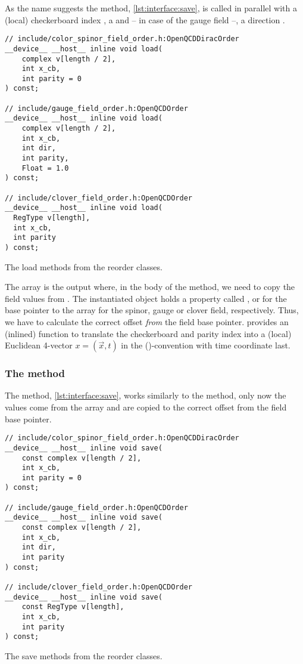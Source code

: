 As the name suggests the  method, \cref{lst:interface:save}, is called in parallel with a (local) checkerboard index , a  and -- in case of the gauge field --, a direction .
\begin{codelisting}
\begin{verbatim}
// include/color_spinor_field_order.h:OpenQCDDiracOrder
__device__ __host__ inline void load(
    complex v[length / 2],
    int x_cb,
    int parity = 0
) const;

// include/gauge_field_order.h:OpenQCDOrder
__device__ __host__ inline void load(
    complex v[length / 2],
    int x_cb,
    int dir,
    int parity,
    Float = 1.0
) const;

// include/clover_field_order.h:OpenQCDOrder
__device__ __host__ inline void load(
  RegType v[length],
  int x_cb,
  int parity
) const;
\end{verbatim}
\caption{The load methods from the reorder classes.}
\label{lst:interface:load}
\end{codelisting}
The array  is the output where, in the body of the method, we need to copy the field values from \openqxd.
The instantiated object holds a property called ,  or  for the base pointer to the \openqxd array for the spinor, gauge or clover field, respectively.
Thus, we have to calculate the correct offset \emph{from} the field base pointer.
\Quda provides an (inlined) function  to translate the checkerboard and parity index into a (local) Euclidean 4-vector $x = (\vec{x}, t)$ in the (\xyzt)-convention with time coordinate last.

\subsubsection{The  method}

The  method, \cref{lst:interface:save}, works similarly to the  method, only now the values come from the  array and are copied to the correct offset from the field base pointer.
\begin{codelisting}
\begin{verbatim}
// include/color_spinor_field_order.h:OpenQCDDiracOrder
__device__ __host__ inline void save(
    const complex v[length / 2],
    int x_cb,
    int parity = 0
) const;

// include/gauge_field_order.h:OpenQCDOrder
__device__ __host__ inline void save(
    const complex v[length / 2],
    int x_cb,
    int dir,
    int parity
) const;

// include/clover_field_order.h:OpenQCDOrder
__device__ __host__ inline void save(
    const RegType v[length],
    int x_cb,
    int parity
) const;
\end{verbatim}
\caption{The save methods from the reorder classes.}
\label{lst:interface:save}
\end{codelisting}

